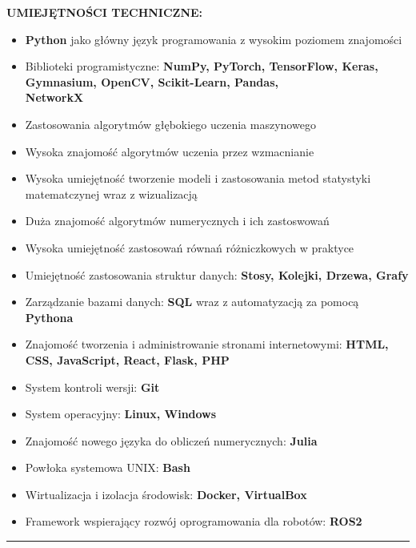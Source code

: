 \documentclass[10pt]{article}
\begin{document}
\noindent \fontsize{14pt}{14pt}\selectfont \textbf{\color{Violet}UMIEJĘTNOŚCI TECHNICZNE:}
\fontsize{10pt}{10pt}\selectfont
\begin{itemize}[leftmargin=*, parsep=0.5pt]
    \item \textbf{Python} jako główny język programowania z wysokim poziomem znajomości 
    \item Biblioteki programistyczne: \textbf{NumPy, PyTorch, TensorFlow, Keras, Gymnasium, OpenCV, Scikit-Learn, Pandas, \\ NetworkX}
    \item Zastosowania algorytmów głębokiego uczenia maszynowego
    \item Wysoka znajomość algorytmów uczenia przez wzmacnianie
    \item Wysoka umiejętność tworzenie modeli i zastosowania metod statystyki matematczynej wraz z wizualizacją
    \item Duża znajomość algorytmów numerycznych i ich zastoswowań
    \item Wysoka umiejętność zastosowań równań różniczkowych w praktyce
    \item Umiejętność zastosowania struktur danych: \textbf{Stosy, Kolejki, Drzewa, Grafy}
    \item Zarządzanie bazami danych: \textbf{SQL} wraz z automatyzacją za pomocą \textbf{Pythona}
    \item Znajomość tworzenia i administrowanie stronami internetowymi: \textbf{HTML, CSS, JavaScript, React, Flask, PHP}
    \item System kontroli wersji: \textbf{Git}
    \item System operacyjny: \textbf{Linux, Windows}
    \item Znajomość nowego języka do obliczeń numerycznych: \textbf{Julia}
    \item Powłoka systemowa UNIX: \textbf{Bash} 
    \item Wirtualizacja i izolacja środowisk: \textbf{Docker, VirtualBox}
    \item Framework wspierający rozwój oprogramowania dla robotów: \textbf{ROS2}
\end{itemize}
\rule{17cm}{1pt} \\
\end{document}

